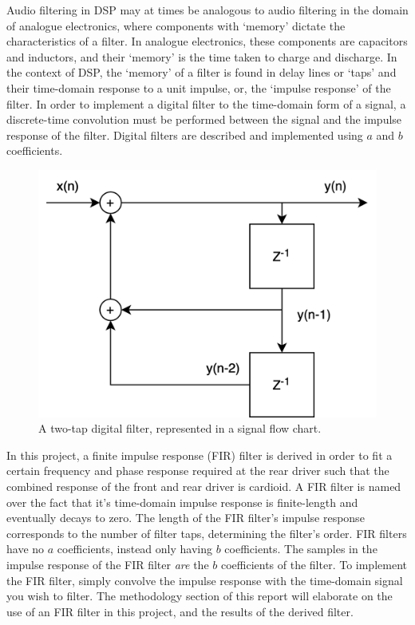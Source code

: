 \documentclass{report}
\begin{document}
        Audio filtering in DSP may at times be analogous to audio filtering in the domain of analogue electronics, where components with `memory' dictate the characteristics of a filter. 
        In analogue electronics, these components are capacitors and inductors, and their `memory' is the time taken to charge and discharge.
        In the context of DSP, the `memory' of a filter is found in delay lines or `taps' and their time-domain response to a unit impulse, or, the `impulse response' of the filter.
        In order to implement a digital filter to the time-domain form of a signal, a discrete-time convolution must be performed between the signal and the impulse response of the filter.
        Digital filters are described and implemented using $a$ and $b$ coefficients.

        \begin{figure}[H]
            \centering
            \includegraphics[width = 0.4\linewidth]{figs/filterGraph.png}
            \caption{A two-tap digital filter, represented in a signal flow chart.}
            \label{filterGraph}
        \end{figure}
        
        In this project, a finite impulse response (FIR) filter is derived in order to fit a certain frequency and phase response required at the rear driver such that the combined response of the front and rear driver is cardioid.
        A FIR filter is named over the fact that it's time-domain impulse response is finite-length and eventually decays to zero.
        The length of the FIR filter's impulse response corresponds to the number of filter taps, determining the filter's order.
        FIR filters have no $a$ coefficients, instead only having $b$ coefficients.
        The samples in the impulse response of the FIR filter \textit{are} the $b$ coefficients of the filter.
        To implement the FIR filter, simply convolve the impulse response with the time-domain signal you wish to filter.
        The methodology section of this report will elaborate on the use of an FIR filter in this project, and the results of the derived filter.
\end{document}
